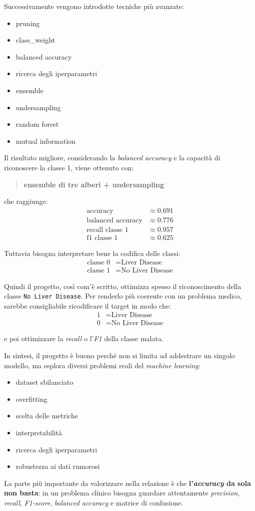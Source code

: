 \documentclass[11pt,a4paper]{article}
\begin{document}
Successivamente vengono introdotte tecniche più avanzate:
\begin{itemize}
    \item pruning
    \item class\_weight
    \item balanced accuracy
    \item ricerca degli iperparametri
    \item ensemble
    \item undersampling
    \item random forest
    \item mutual information
\end{itemize}

Il risultato migliore, considerando la \textit{balanced accuracy} e la capacità di riconoscere la classe 1, viene ottenuto con:
\begin{quote}
    \textbf{ensemble di tre alberi + undersampling}
\end{quote}

che raggiunge:
\begin{align*}
    \text{accuracy} &\approx 0.691 \\
    \text{balanced accuracy} &\approx 0.776 \\
    \text{recall classe 1} &\approx 0.957 \\
    \text{f1 classe 1} &\approx 0.625
\end{align*}

Tuttavia bisogna interpretare bene la codifica delle classi:
\begin{align*}
    \text{classe 0} &= \text{Liver Disease} \\
    \text{classe 1} &= \text{No Liver Disease}
\end{align*}

Quindi il progetto, così com'è scritto, ottimizza spesso il riconoscimento della classe \texttt{No Liver Disease}. Per renderlo più coerente con un problema medico, sarebbe consigliabile ricodificare il target in modo che:
\begin{align*}
    1 &= \text{Liver Disease} \\
    0 &= \text{No Liver Disease}
\end{align*}

e poi ottimizzare la \textit{recall} o l'\textit{F1} della classe malata.

In sintesi, il progetto è buono perché non si limita ad addestrare un singolo modello, ma esplora diversi problemi reali del \textit{machine learning}:
\begin{itemize}
    \item dataset sbilanciato
    \item overfitting
    \item scelta delle metriche
    \item interpretabilità
    \item ricerca degli iperparametri
    \item robustezza ai dati rumorosi
\end{itemize}

La parte più importante da valorizzare nella relazione è che \textbf{l'\textit{accuracy} da sola non basta}: in un problema clinico bisogna guardare attentamente \textit{precision}, \textit{recall}, \textit{F1-score}, \textit{balanced accuracy} e matrice di confusione.
\end{document}
